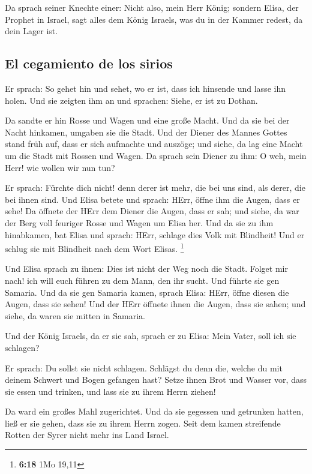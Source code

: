 Da sprach seiner Knechte einer: Nicht also, mein Herr
König; sondern Elisa, der Prophet in Israel, sagt alles dem König
Israels, was du in der Kammer redest, da dein Lager ist.

\hypertarget{el-cegamiento-de-los-sirios}{%
\subsection{El cegamiento de los
sirios}\label{el-cegamiento-de-los-sirios}}

 Er sprach: So gehet hin und sehet, wo er ist, dass ich
hinsende und lasse ihn holen. Und sie zeigten ihm an und sprachen:
Siehe, er ist zu Dothan.

 Da sandte er hin Rosse und Wagen und eine große Macht.
Und da sie bei der Nacht hinkamen, umgaben sie die Stadt.
 Und der Diener des Mannes Gottes stand früh auf, dass er
sich aufmachte und auszöge; und siehe, da lag eine Macht um die Stadt
mit Rossen und Wagen. Da sprach sein Diener zu ihm: O weh, mein Herr!
wie wollen wir nun tun?

 Er sprach: Fürchte dich nicht! denn derer ist mehr, die
bei uns sind, als derer, die bei ihnen sind.  Und Elisa
betete und sprach: HErr, öffne ihm die Augen, dass er sehe! Da öffnete
der HErr dem Diener die Augen, dass er sah; und siehe, da war der Berg
voll feuriger Rosse und Wagen um Elisa her.  Und da sie
zu ihm hinabkamen, bat Elisa und sprach: HErr, schlage dies Volk mit
Blindheit! Und er schlug sie mit Blindheit nach dem Wort Elisas.
\footnote{\textbf{6:18} 1Mo 19,11}

 Und Elisa sprach zu ihnen: Dies ist nicht der Weg noch
die Stadt. Folget mir nach! ich will euch führen zu dem Mann, den ihr
sucht. Und führte sie gen Samaria.  Und da sie gen
Samaria kamen, sprach Elisa: HErr, öffne diesen die Augen, dass sie
sehen! Und der HErr öffnete ihnen die Augen, dass sie sahen; und siehe,
da waren sie mitten in Samaria.

 Und der König Israels, da er sie sah, sprach er zu
Elisa: Mein Vater, soll ich sie schlagen?

 Er sprach: Du sollst sie nicht schlagen. Schlägst du
denn die, welche du mit deinem Schwert und Bogen gefangen hast? Setze
ihnen Brot und Wasser vor, dass sie essen und trinken, und lass sie zu
ihrem Herrn ziehen!

 Da ward ein großes Mahl zugerichtet. Und da sie gegessen
und getrunken hatten, ließ er sie gehen, dass sie zu ihrem Herrn zogen.
Seit dem kamen streifende Rotten der Syrer nicht mehr ins Land Israel.


